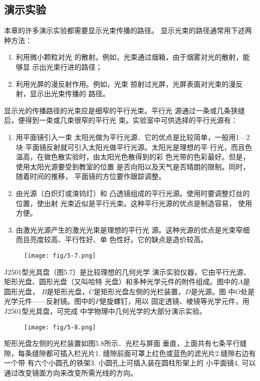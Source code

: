 \subsection{演示实验}

本章的许多演示实验都需要显示光束传播的路径。
显示光束的路径通常用下述两种方法：
\begin{enumerate}
\item 利用微小颗粒对光
的散射。例如，光束通过烟箱，由于烟雾对光的散射，能够显
示出光束行进的路径；
\item 利用光屏的漫反射作用。例如，光束
掠射过光屏，光屏表面对光束的漫反射，显示出光束传播的
路径。
\end{enumerate}

显示光的传播路径的光束应是细窄的平行光束。平行光
源通过一条或几条狭缝后，便得到一束或几束很窄的平行光
束。实验室中可供选择的平行光源有：
\begin{enumerate}
\item 用平面镜引入一束
太阳光做为平行光源．它的优点是比较简单，一般用1—2块
平面镜反射就可引入太阳光做平行光源。太阳光是理想的平
行光，而且色温高，在做色散实验时，由太阳光色散得到的彩
色光带的色彩最好。但是，使用太阳光源要受到教室的位置
是否向阳以及天气是否晴朗的限制。同时，随着时间的推移，
平面镜的方位要作跟踪调整。
    \item 由光源（白炽灯或溴钨灯）和
凸透镜组成的平行光源。使用时要调整灯丝的位置，使出射
光束近似是平行光束。这种平行光源的优点是制造容易，
使用方便。
    \item 由激光光源产生的激光光束是理想的平行光
源。这种光源的优点是光束窄细而且亮度较高、平行性好、单
色性好。它的缺点是造价较高。
\end{enumerate}

\begin{figure}[htp]
    \centering
    \texttt{[image: fig/5-7.png]}
    \caption{}
\end{figure}

J2501型光具盘（图5.7）是比较理想的几何光学
演示实验仪器，它由平行光源、矩形光盘、圆形光盘（又叫哈特
光盘）和多种光学元件的附件组成。图中的$A$是圆形光盘，
$B$是矩形光盘，$C$是矩形光盘左侧的光栏装置，$D$是光源。图
中$O$处是光学元件——反射镜。图中的$P$是旋螺钉，用以
固定透镜、棱镜等光学元件，用J2501型光具盘，可完成
中学物理中几何光学的大部分演示实验。

\begin{figure}[htp]
    \centering
    \texttt{[image: fig/5-8.png]}
    \caption{}
\end{figure}

矩形光盘左侧的光栏装置如图5.8所示．光栏与屏面
垂直，上面共有七条平行缝隙，每条缝隙都可插入栏光片1. 
缝隙前面可罩上红色或蓝色的滤光片2.缝隙右边有一个带
有六个小圆孔的铁架3. 小圆孔上可插入装在圆柱形架上的
小平面镜4, 可以通过改变镜面方向来改变所需光线的方向。

